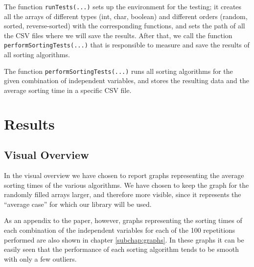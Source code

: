 \documentclass{article}
\begin{document}
The function \texttt{runTests(...)} sets up the environment for the testing; it creates all the arrays of different types (int, char, boolean) and different orders (random, sorted, reverse-sorted) with the corresponding functions, and sets the path of all the CSV files where we will save the results. After that, we call the function \texttt{performSortingTests(...)} that is responsible to measure and save the results of all sorting algorithms.

The function \texttt{performSortingTests(...)} runs all sorting algorithms for the given combination of independent variables, and stores the resulting data and the average sorting time in a specific CSV file.

\newpage

\section{Results}
\subsection{Visual Overview}
In the visual overview we have chosen to report graphs representing the average sorting times of the various algorithms. We have chosen to keep the graph for the randomly filled arrays larger, and therefore more visible, since it represents the “average case” for which our library will be used.

As an appendix to the paper, however, graphs representing the sorting times of each combination of the independent variables for each of the 100 repetitions performed are also shown in chapter \ref{subchap:graphs}. In these graphs it can be easily seen that the performance of each sorting algorithm tends to be smooth with only a few outliers.
\end{document}
